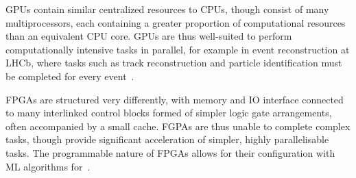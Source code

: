 GPUs contain similar centralized resources to CPUs, though consist of many multiprocessors, each containing a greater proportion of computational resources than an equivalent CPU core. GPUs are thus well-suited to perform computationally intensive tasks in parallel, for example in event reconstruction at LHCb, where tasks such as track reconstruction and particle identification must be completed for every event~\cite{vomBruch-gpus}.

FPGAs are structured very differently, with memory and IO interface connected to many interlinked control blocks formed of simpler logic gate arrangements, often accompanied by a small cache. FGPAs are thus unable to complete complex tasks, though provide significant acceleration of simpler, highly parallelisable tasks. The programmable nature of FPGAs allows for their configuration with ML algorithms for~\cite{duarte-fpgas, muons-fpgas}.